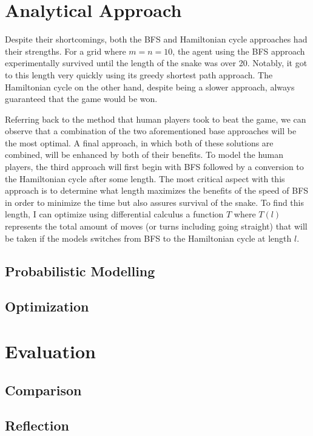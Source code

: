 \documentclass[12pt]{article}
\begin{document}
\section{Analytical Approach}

Despite their shortcomings, both the BFS and Hamiltonian cycle approaches had their strengths. For a grid where $m=n=10$, the agent using the BFS approach experimentally survived until the length of the snake was over 20. Notably, it got to this length very quickly using its greedy shortest path approach. The Hamiltonian cycle on the other hand, despite being a slower approach, always guaranteed that the game would be won.

Referring back to the method that human players took to beat the game, we can observe that a combination of the two aforementioned base approaches will be the most optimal. A final approach, in which both of these solutions are combined, will be enhanced by both of their benefits. To model the human players, the third approach will first begin with BFS followed by a conversion to the Hamiltonian cycle after some length. The most critical aspect with this approach is to determine what length maximizes the benefits of the speed of BFS in order to minimize the time but also assures survival of the snake. To find this length, I can optimize using differential calculus a function $T$  where $T(l)$ represents the total amount of moves (or turns including going straight) that will be taken if the models switches from BFS to the Hamiltonian cycle at length $l$.

\subsection{Probabilistic Modelling}



\subsection{Optimization}

\section{Evaluation}

\subsection{Comparison}

\subsection{Reflection}
\end{document}
